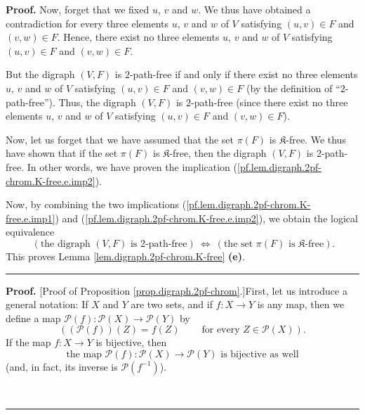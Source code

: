 \documentclass[numbers=enddot,12pt,final,onecolumn,notitlepage]{scrartcl}%
\theoremstyle{definition}
\newenvironment{proof}[1][Proof]{\noindent\textbf{#1.} }{\ \rule{0.5em}{0.5em}}
\newenvironment{verlong}{}{}
\begin{document}
\begin{verlong}
\begin{proof}
Now, forget that we fixed $u$, $v$ and $w$. We thus have obtained a
contradiction for every three elements $u$, $v$ and $w$ of $V$ satisfying
$\left(  u,v\right)  \in F$ and $\left(  v,w\right)  \in F$. Hence, there
exist no three elements $u$, $v$ and $w$ of $V$ satisfying $\left(
u,v\right)  \in F$ and $\left(  v,w\right)  \in F$.

But the digraph $\left(  V,F\right)  $ is $2$-path-free if and only if there
exist no three elements $u$, $v$ and $w$ of $V$ satisfying $\left(
u,v\right)  \in F$ and $\left(  v,w\right)  \in F$ (by the definition of
\textquotedblleft$2$-path-free\textquotedblright). Thus, the digraph $\left(
V,F\right)  $ is $2$-path-free (since there exist no three elements $u$, $v$
and $w$ of $V$ satisfying $\left(  u,v\right)  \in F$ and $\left(  v,w\right)
\in F$).

Now, let us forget that we have assumed that the set $\pi\left(  F\right)  $
is $\mathfrak{K}$-free. We thus have shown that if the set $\pi\left(
F\right)  $ is $\mathfrak{K}$-free, then the digraph $\left(  V,F\right)  $ is
$2$-path-free. In other words, we have proven the implication
(\ref{pf.lem.digraph.2pf-chrom.K-free.e.imp2}).

Now, by combining the two implications
(\ref{pf.lem.digraph.2pf-chrom.K-free.e.imp1}) and
(\ref{pf.lem.digraph.2pf-chrom.K-free.e.imp2}), we obtain the logical
equivalence%
\[
\ \left(  \text{the digraph }\left(  V,F\right)  \text{ is }2\text{-path-free}%
\right)  \ \Longleftrightarrow\ \left(  \text{the set }\pi\left(  F\right)
\text{ is }\mathfrak{K}\text{-free}\right)  .
\]
This proves Lemma \ref{lem.digraph.2pf-chrom.K-free} \textbf{(e)}.
\end{proof}

\begin{proof}
[Proof of Proposition \ref{prop.digraph.2pf-chrom}.]First, let us introduce a
general notation: If $X$ and $Y$ are two sets, and if $f:X\rightarrow Y$ is
any map, then we define a map $\mathcal{P}\left(  f\right)  :\mathcal{P}%
\left(  X\right)  \rightarrow\mathcal{P}\left(  Y\right)  $ by%
\[
\left(  \left(  \mathcal{P}\left(  f\right)  \right)  \left(  Z\right)
=f\left(  Z\right)  \ \ \ \ \ \ \ \ \ \ \text{for every }Z\in\mathcal{P}%
\left(  X\right)  \right)  .
\]
If the map $f:X\rightarrow Y$ is bijective, then%
\begin{equation}
\text{the map }\mathcal{P}\left(  f\right)  :\mathcal{P}\left(  X\right)
\rightarrow\mathcal{P}\left(  Y\right)  \text{ is bijective as well}
\label{pf.prop.digraph.2pf-chrom.P(f)bij}%
\end{equation}
(and, in fact, its inverse is $\mathcal{P}\left(  f^{-1}\right)  $).


\end{proof}
\end{verlong}
\end{document}
